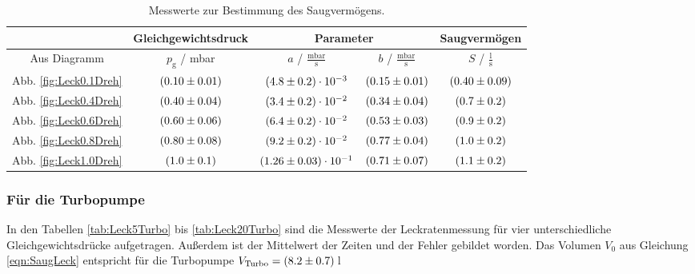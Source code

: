 \begin{table}[H]
   \centering
   \caption{Messwerte zur Bestimmung des Saugvermögens.}
   \label{tab:SaugLeckDreh}
   \begin{tabular}{c|c|c|c|c}
     & Gleichgewichtsdruck & \multicolumn{2}{c|}{Parameter} & Saugvermögen \\
     \midrule
     Aus Diagramm & $p_\text{g}$ / mbar & $a$ / $\frac{\text{mbar}}{\text{s}}$ & $b$ / $\frac{\text{mbar}}{\text{s}}$ & $S$ / $\frac{\text{l}}{\text{s}}$ \\
     \midrule
     Abb. \eqref{fig:Leck0.1Dreh} & $(\num{0.1 +- 0.01})$ & $(\num{4.8 +- 0.2}) \cdot 10^{-3}$ & $(\num{0.15 +- 0.01})$ & $(\num{0.40 +- 0.09})$ \\
     Abb. \eqref{fig:Leck0.4Dreh} & $(\num{0.4 +- 0.04})$ & $(\num{3.4 +- 0.2}) \cdot 10^{-2}$ & $(\num{0.34 +- 0.04}) $ & $(\num{0.7 +- 0.2}) $ \\
     Abb. \eqref{fig:Leck0.6Dreh} & $(\num{0.6 +- 0.06})$ & $(\num{6.4 +- 0.2}) \cdot 10^{-2}$ & $(\num{0.53 +- 0.03}) $ & $(\num{0.9 +- 0.2}) $ \\
     Abb. \eqref{fig:Leck0.8Dreh} & $(\num{0.8 +- 0.08})$ & $(\num{9.2 +- 0.2}) \cdot 10^{-2}$ & $(\num{0.77 +- 0.04}) $ & $(\num{1.0 +- 0.2}) $ \\
     Abb. \eqref{fig:Leck1.0Dreh} & $(\num{1.0 +- 0.1})$ & $(\num{1.26 +- 0.03}) \cdot 10^{-1}$ & $(\num{0.71 +- 0.07}) $ & $(\num{1.1 +- 0.2}) $ \\
 \end{tabular}
\end{table}



\subsubsection{Für die Turbopumpe}
In den Tabellen \eqref{tab:Leck5Turbo} bis \eqref{tab:Leck20Turbo} sind die Messwerte der Leckratenmessung für vier unterschiedliche Gleichgewichtsdrücke aufgetragen. Außerdem ist der Mittelwert der Zeiten und der Fehler gebildet worden. Das Volumen $V_0$ aus Gleichung \eqref{eqn:SaugLeck} entspricht für die Turbopumpe $V_\text{Turbo} = (\num{8.2 +- 0.7})$\,l

